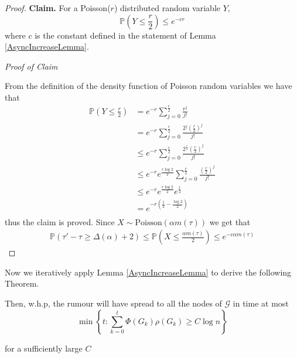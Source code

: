 \begin{proof}
	\noindent
	\textbf{Claim.} For a Poisson($r$) distributed random variable $Y$, 
	$$
		\mathbb{P}(Y \leq \frac{r}{2}) \leq e^{-cr}
	$$
	where $c$ is the constant defined in the statement of Lemma \ref{AsyncIncreaseLemma}.

	\noindent
	\textit{Proof of Claim}

	\noindent
	From the definition of the density function of Poisson random variables we have that 
	\begin{align*}
		\mathbb{P}(Y \leq \frac{r}{2}) & = e^{-r} \sum_{j=0}^\frac{r}{2} \frac{r^j}{j!} \\ %
		& = e^{-r} \sum_{j=0}^\frac{r}{2} \frac{2^j(\frac{r}{2})^j}{j!} \\
		& \leq e^{-r} \sum_{j=0}^\frac{r}{2} \frac{2^\frac{r}{2}(\frac{r}{2})^j}{j!} \\
		& \leq e^{-r} e^\frac{r \log 2}{2} \sum_{j=0}^\frac{r}{2} \frac{(\frac{r}{2})^j}{j!} \\
		& \leq e^{-r} e^\frac{r \log 2}{2} e^\frac{r}{2} \\
		& = e^{-r(\frac{1}{2} - \frac{\log2}{2})} \\ %
	\end{align*}
	thus the claim is proved. Since $X \sim \text{Poisson}(\alpha m(\tau))$ we get that
	\begin{align*}
		\mathbb{P}(\tau' - \tau \geq \Delta(\alpha) + 2) \leq \mathbb{P}(X \leq \frac{\alpha m(\tau)}{2}) \leq e^{-c \alpha m(\tau)}
	\end{align*}	
\end{proof}

Now we iteratively apply Lemma \ref{AsyncIncreaseLemma} to derive the following Theorem.

\begin{theorem}\label{theorem:AsyncUpperBound}
	\ModelIntro Then, w.h.p, the rumour will have spread to all the nodes of $\mathcal{G}$ in time at most
	$$
		\min \left\{t : \sum_{k=0}^t \Phi(G_k)\rho(G_k) \geq C \log n \right\} 
	$$
	
	\noindent
	for a sufficiently large $C$
\end{theorem}

